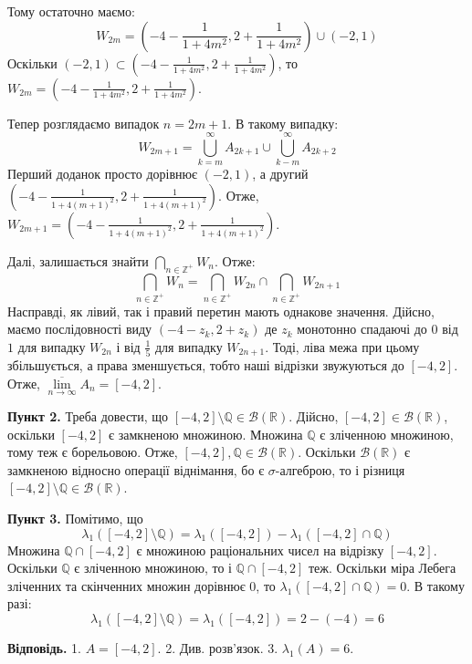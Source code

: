 \documentclass[14pt]{extarticle}
\begin{document}
Тому остаточно маємо:
\[
W_{2m} = \left(-4 - \frac{1}{1+4m^2},2+\frac{1}{1+4m^2}\right) \cup (-2,1)
\]
Оскільки $(-2,1) \subset \left(-4 - \frac{1}{1+4m^2},2+\frac{1}{1+4m^2}\right)$, то $W_{2m}=\left(-4 - \frac{1}{1+4m^2},2+\frac{1}{1+4m^2}\right)$.

Тепер розглядаємо випадок $n=2m+1$. В такому випадку:
\[
W_{2m+1} = \bigcup_{k=m}^{\infty}A_{2k+1} \cup \bigcup_{k-m}^{\infty}A_{2k+2} 
\]
Перший доданок просто дорівнює $(-2,1)$, а другий $\left(-4-\frac{1}{1+4(m+1)^2},2+\frac{1}{1+4(m+1)^2}\right)$. Отже, $W_{2m+1}=\left(-4-\frac{1}{1+4(m+1)^2},2+\frac{1}{1+4(m+1)^2}\right)$.

Далі, залишається знайти $\bigcap_{n \in \mathbb{Z}^+}W_n$. Отже:
\[
\bigcap_{n \in \mathbb{Z}^+}W_n = \bigcap_{n\in\mathbb{Z}^+}W_{2n} \cap \bigcap_{n \in \mathbb{Z}^+}W_{2n+1}
\]
Насправді, як лівий, так і правий перетин мають однакове значення. Дійсно, маємо послідовності виду $(-4-z_k,2+z_k)$ де $z_k$ монотонно спадаючі до $0$ від $1$ для випадку $W_{2n}$ і від $\frac{1}{5}$ для випадку $W_{2n+1}$. Тоді, ліва межа при цьому збільшується, а права зменшується, тобто наші відрізки звужуються до $[-4,2]$. Отже, $\underset{n \to \infty}{\overline{\lim}} A_n= [-4,2]$.

\textbf{Пункт 2.} Треба довести, що $[-4,2] \setminus \mathbb{Q} \in \mathcal{B}(\mathbb{R})$. Дійсно, $[-4,2] \in \mathcal{B}(\mathbb{R})$, оскільки $[-4,2]$ є замкненою множиною. Множина $\mathbb{Q}$ є зліченною множиною, тому теж є борельовою. Отже, $[-4,2],\mathbb{Q} \in \mathcal{B}(\mathbb{R})$. Оскільки $\mathcal{B}(\mathbb{R})$ є замкненою відносно операції віднімання, бо є $\sigma$-алгеброю, то і різниця $[-4,2]\setminus \mathbb{Q} \in \mathcal{B}(\mathbb{R})$.

\textbf{Пункт 3.} Помітимо, що
\[
\lambda_1([-4,2] \setminus \mathbb{Q}) = \lambda_1([-4,2]) - \lambda_1([-4,2] \cap \mathbb{Q})
\]
Множина $\mathbb{Q} \cap [-4,2]$ є множиною раціональних чисел на відрізку $[-4,2]$. Оскільки $\mathbb{Q}$ є зліченною множиною, то і $\mathbb{Q} \cap [-4,2]$ теж. Оскільки міра Лебега зліченних та скінченних множин дорівнює $0$, то $\lambda_1([-4,2] \cap \mathbb{Q})=0$. В такому разі:
\[
\lambda_1([-4,2] \setminus \mathbb{Q}) = \lambda_1([-4,2]) = 2 - (-4) = 6
\]

\textbf{Відповідь.} 1. $A=[-4, 2]$. 2. Див. розв'язок. 3. $\lambda_1(A)=6$.
\end{document}
